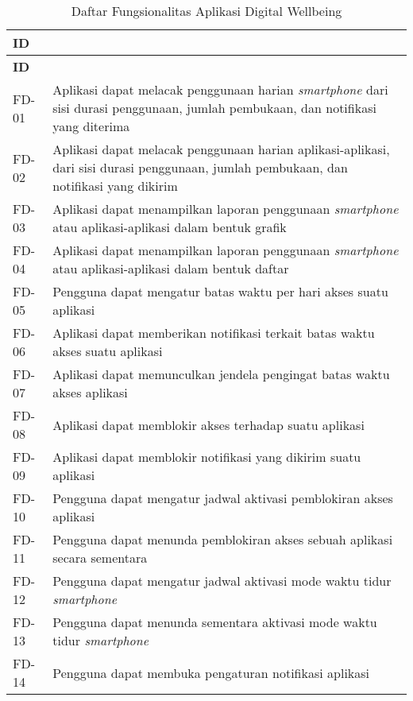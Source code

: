 \RaggedLeft
\begin{small}
\begin{longtable}[c]{|W{c}{0.08\textwidth}|>{\ccnormspacing}m{0.82\textwidth}|}
  \caption{Daftar Fungsionalitas Aplikasi Digital Wellbeing}
  \label{tab:daftar_fungsionalitas_app_dw} \\
  \hline {} \textbf{ID} &  \\ \hline \endfirsthead
  \hline {} \textbf{ID} &  \\ \hline \endhead
  
  \hline \endfoot
  
  FD-01  &  Aplikasi dapat melacak penggunaan harian \textit{smartphone} dari sisi durasi penggunaan, jumlah pembukaan, dan notifikasi yang diterima \\ \hline
  FD-02  &  Aplikasi dapat melacak penggunaan harian aplikasi-aplikasi, dari sisi durasi penggunaan, jumlah pembukaan, dan notifikasi yang dikirim \\ \hline
  FD-03  &  Aplikasi dapat menampilkan laporan penggunaan \textit{smartphone} atau aplikasi-aplikasi dalam bentuk grafik \\ \hline
  FD-04  &  Aplikasi dapat menampilkan laporan penggunaan \textit{smartphone} atau aplikasi-aplikasi dalam bentuk daftar \\ \hline
  FD-05  &  Pengguna dapat mengatur batas waktu per hari akses suatu aplikasi \\ \hline
  FD-06  &  Aplikasi dapat memberikan notifikasi terkait batas waktu akses suatu aplikasi \\ \hline
  FD-07  &  Aplikasi dapat memunculkan jendela pengingat batas waktu akses aplikasi \\ \hline
  FD-08  &  Aplikasi dapat memblokir akses terhadap suatu aplikasi \\ \hline
  FD-09  &  Aplikasi dapat memblokir notifikasi yang dikirim suatu aplikasi \\ \hline
  FD-10  &  Pengguna dapat mengatur jadwal aktivasi pemblokiran akses aplikasi \\ \hline
  FD-11  &  Pengguna dapat menunda pemblokiran akses sebuah aplikasi secara sementara \\ \hline
  FD-12  &  Pengguna dapat mengatur jadwal aktivasi mode waktu tidur \textit{smartphone} \\ \hline
  FD-13  &  Pengguna dapat menunda sementara aktivasi mode waktu tidur \textit{smartphone} \\ \hline
  FD-14  &  Pengguna dapat membuka pengaturan notifikasi aplikasi \\ \hline
\end{longtable}
\end{small}
\justifying
\FloatBarrier

